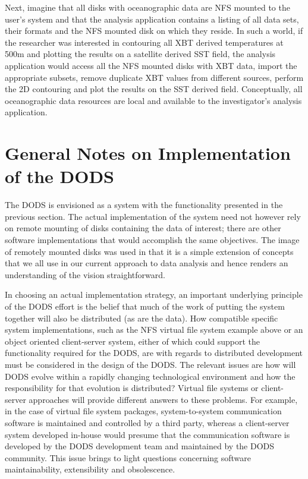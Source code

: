Next, imagine that all disks with oceanographic data are NFS mounted to the
user's system and that the analysis application contains a listing of all
data sets, their formats and the NFS mounted disk on which they 
reside. In such a world, if the
researcher was interested in contouring all XBT derived temperatures at 500m
and plotting the results on a satellite derived SST field, the 
analysis application would access all the NFS mounted disks with XBT data,
import the appropriate subsets, remove duplicate XBT values from different
sources, perform the 2D contouring and plot the results on the SST derived
field.  Conceptually, all oceanographic data resources are local and
available to the investigator's analysis application.

\section{\bf General Notes on Implementation of the DODS}

The DODS is envisioned as a system with the functionality presented in the
previous section. The actual implementation of the system need not however
rely on remote mounting of disks containing the data of interest; there are
other software implementations that would accomplish the same objectives. The
image of remotely mounted disks was used in that it is a simple extension of
concepts that we all use in our current approach to data analysis and hence
renders an understanding of the vision straightforward.

In choosing an actual implementation strategy, an important underlying 
principle of the DODS effort is the belief that much
of the work of putting the system together will also be distributed (as are
the data).  How compatible specific system implementations, such as the NFS
virtual file system example above or an object oriented client-server system,
either of which could support the functionality required for the DODS, are
with regards to distributed development must be considered in the design of
the DODS.  The relevant issues are how will DODS evolve within a rapidly
changing technological environment and how the responsibility for that 
evolution is distributed? Virtual file systems or client-server approaches 
will provide different answers to these problems.  For example, in the case 
of virtual file system packages, system-to-system communication software is
maintained and controlled by a third party, whereas a client-server system
developed in-house would presume that the communication software is developed
by the DODS development team and maintained by the DODS community.  This
issue brings to light questions concerning software maintainability,
extensibility and obsolescence.  

